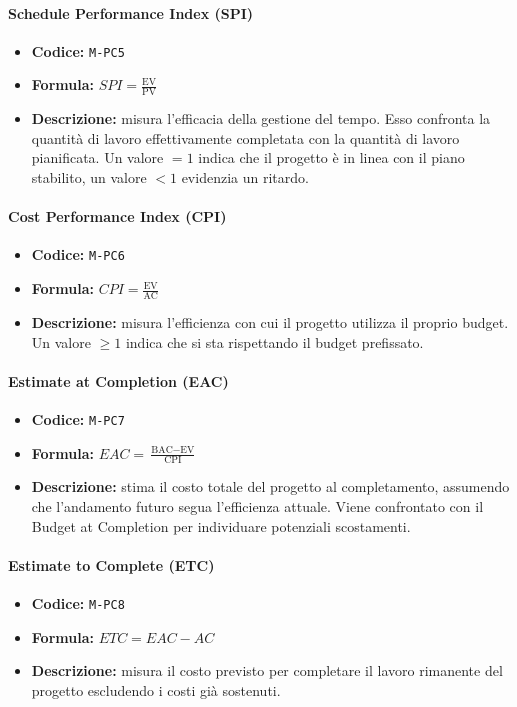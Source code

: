 \documentclass[a4paper,12pt]{article}
\begin{document}
\paragraph{Schedule Performance Index (SPI)}
\begin{itemize}
    \item \textbf{Codice:} \texttt{M-PC5}
    \item \textbf{Formula:} $SPI=\frac{\text{EV}}{\text{PV}}$
    \item \textbf{Descrizione:} misura l'efficacia della gestione del tempo. Esso confronta la quantità di lavoro effettivamente completata con la quantità di lavoro pianificata. Un valore $=1$ indica che il progetto è in linea con il piano stabilito, un valore $<1$ evidenzia un ritardo.
\end{itemize}

\paragraph{Cost Performance Index (CPI)}
\begin{itemize}
    \item \textbf{Codice:} \texttt{M-PC6}
    \item \textbf{Formula:} $CPI=\frac{\text{EV}}{\text{AC}}$
    \item \textbf{Descrizione:} misura l'efficienza con cui il progetto utilizza il proprio budget. Un valore $\geq 1$ indica che si sta rispettando il budget prefissato.
\end{itemize}

\paragraph{Estimate at Completion (EAC)}
\begin{itemize}
    \item \textbf{Codice:} \texttt{M-PC7}
    \item \textbf{Formula:} $EAC=\frac{\text{BAC}-\text{EV}}{\text{CPI}}$
    \item \textbf{Descrizione:} stima il costo totale del progetto al completamento, assumendo che l’andamento futuro segua l’efficienza attuale. Viene confrontato con il Budget at Completion per individuare potenziali scostamenti.
\end{itemize}

\paragraph{Estimate to Complete (ETC)}
\begin{itemize}
    \item \textbf{Codice:} \texttt{M-PC8}
    \item \textbf{Formula:} $ETC=EAC-AC$
    \item \textbf{Descrizione:} misura il costo previsto per completare il lavoro rimanente del progetto escludendo i costi già sostenuti.
\end{itemize}
\end{document}
